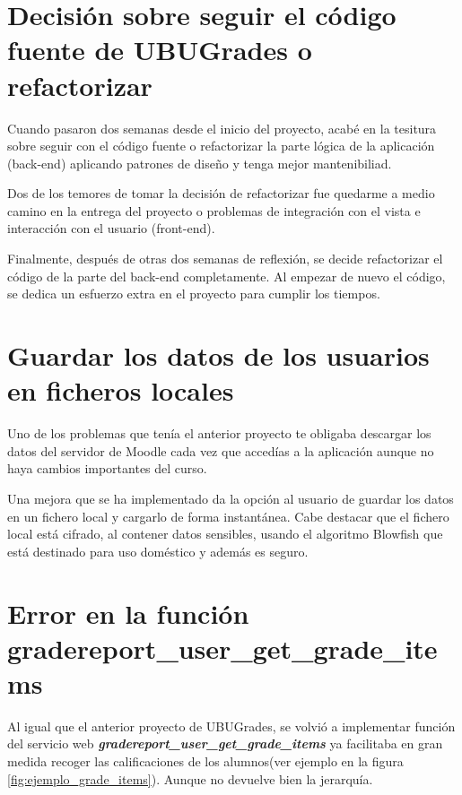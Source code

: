 \section{Decisión sobre seguir el código fuente de UBUGrades o refactorizar}

Cuando pasaron dos semanas desde el inicio del proyecto, acabé en la tesitura sobre seguir con el código fuente o refactorizar la parte lógica de la aplicación (back-end) aplicando patrones de diseño y tenga mejor mantenibiliad. 

Dos de los temores de tomar la decisión de refactorizar fue quedarme a medio camino en la entrega del proyecto o problemas de integración con el vista e interacción con el usuario (front-end).

Finalmente, después de otras dos semanas de reflexión, se decide refactorizar el código de la parte del back-end completamente. Al empezar de nuevo el código,  se dedica un esfuerzo extra en el proyecto para cumplir los tiempos.

\section{Guardar los datos de los usuarios en ficheros locales}

Uno de los problemas que tenía el anterior proyecto te obligaba descargar los datos del servidor de Moodle cada vez que accedías a la aplicación aunque no haya cambios importantes del curso.

Una mejora que se ha implementado da la opción al usuario de guardar los datos en un fichero local y cargarlo de forma instantánea. Cabe destacar que el fichero local está cifrado, al contener datos sensibles, usando el algoritmo Blowfish \cite{noauthor_schneier_nodate} que está destinado para uso doméstico y además es seguro.


\section{Error en la función gradereport\_user\_get\_grade\_items}

Al igual que el anterior proyecto de UBUGrades, se volvió a implementar función del servicio web \textbf{\textit{gradereport\_user\_get\_grade\_items}} ya facilitaba en gran medida recoger las calificaciones de los alumnos(ver ejemplo en la figura \ref{fig:ejemplo_grade_items}). Aunque no devuelve bien la jerarquía.



